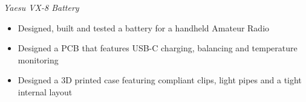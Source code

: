 \documentclass[line,mmmargin]{res}
\begin{document}
\begin{resume}
	\vspace{-10pt}
	{\sl Yaesu VX-8 Battery}
		\begin{itemize} \itemsep -2pt
			\item Designed, built and tested a battery for a
				handheld Amateur Radio
			\item Designed a PCB that features USB-C charging,
				balancing  and temperature monitoring
			\item Designed a 3D printed case featuring compliant
				clips, light pipes and a tight internal layout
		\end{itemize}
	\vspace{-10pt}


\end{resume}
\end{document}
